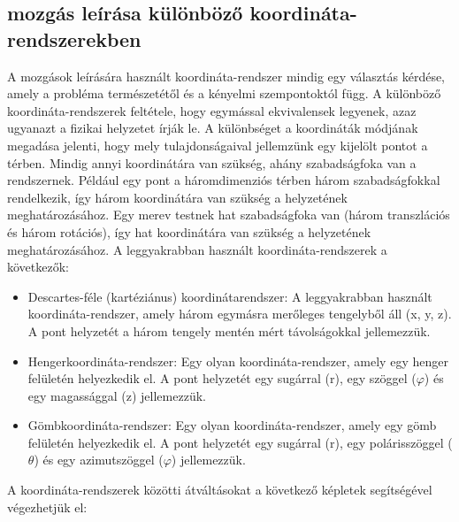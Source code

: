 \documentclass[../main.tex]{subfiles}
\begin{document}
\subsection{mozgás leírása különböző koordináta-rendszerekben}
A mozgások leírására használt koordináta-rendszer mindig egy választás kérdése, amely a probléma természetétől és a kényelmi szempontoktól függ. A különböző koordináta-rendszerek feltétele, hogy egymással ekvivalensek legyenek,
azaz ugyanazt a fizikai helyzetet írják le. A különbséget a koordináták módjának megadása jelenti, hogy mely tulajdonságaival jellemzünk egy kijelölt pontot a térben. Mindig annyi koordinátára van szükség, ahány szabadságfoka van a rendszernek.
Például egy pont a háromdimenziós térben három szabadságfokkal rendelkezik, így három koordinátára van szükség a helyzetének meghatározásához. Egy merev testnek hat szabadságfoka van (három transzlációs és három rotációs),
így hat koordinátára van szükség a helyzetének meghatározásához. A leggyakrabban használt koordináta-rendszerek a következők:
\begin{itemize}
    \item Descartes-féle (kartéziánus) koordinátarendszer: A leggyakrabban használt koordináta-rendszer, amely három egymásra merőleges tengelyből áll (x, y, z). A pont helyzetét a három tengely mentén mért távolságokkal jellemezzük.
    \item Hengerkoordináta-rendszer: Egy olyan koordináta-rendszer, amely egy henger felületén helyezkedik el. A pont helyzetét egy sugárral (r), egy szöggel ($\varphi$) és egy magassággal (z) jellemezzük.
    \item Gömbkoordináta-rendszer: Egy olyan koordináta-rendszer, amely egy gömb felületén helyezkedik el. A pont helyzetét egy sugárral (r), egy polárisszöggel ($\theta$) és egy azimutszöggel ($\varphi$) jellemezzük.
\end{itemize}
A koordináta-rendszerek közötti átváltásokat a következő képletek segítségével végezhetjük el:
\end{document}

